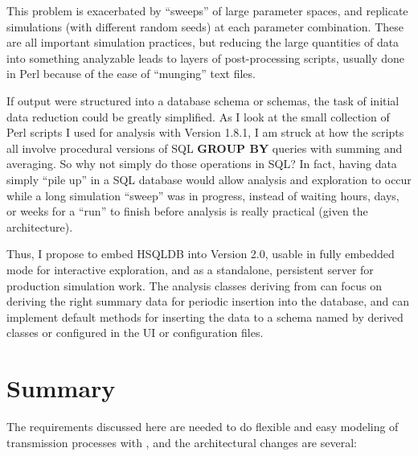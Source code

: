 \documentclass[pdftex,letterpaper,rmp,groupedaddress,floatfix]{revtex4}
\begin{document}
This problem is exacerbated by ``sweeps'' of large parameter spaces, and replicate simulations (with different random seeds) at each parameter combination.  These are all important simulation practices, but reducing the large quantities of data into something analyzable leads to layers of post-processing scripts, usually done in Perl because of the ease of ``munging'' text files.

If output were structured into a database schema or schemas, the task of initial data reduction could be greatly simplified.  As I look at the small collection of Perl scripts I used for analysis with Version 1.8.1, I am struck at how the scripts all involve procedural versions of SQL \textbf{GROUP BY} queries with summing and averaging.  So why not simply do those operations in SQL?  In fact, having data simply ``pile up'' in a SQL database would allow analysis and exploration to occur while a long simulation ``sweep'' was in progress, instead of waiting hours, days, or weeks for a ``run'' to finish before analysis is really practical (given the  architecture).  

Thus, I propose to embed HSQLDB into \tl Version 2.0, usable in fully embedded mode for interactive exploration, and as a standalone, persistent server for production simulation work.  The analysis classes deriving from  can focus on deriving the right summary data for periodic insertion into the database, and  can implement default methods for inserting the data to a schema named by derived classes or configured in the UI or configuration files.  

\section{Summary}

The requirements discussed here are needed to do flexible and easy modeling of transmission processes with \tl, and the architectural changes are several:
\end{document}
